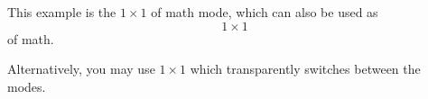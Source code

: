 This example is the $1 \times 1$ of math mode, which can also be used as $$1 \times 1$$ of math.

Alternatively, you may use \ensuremath{1 \times 1} which transparently switches between the modes.
